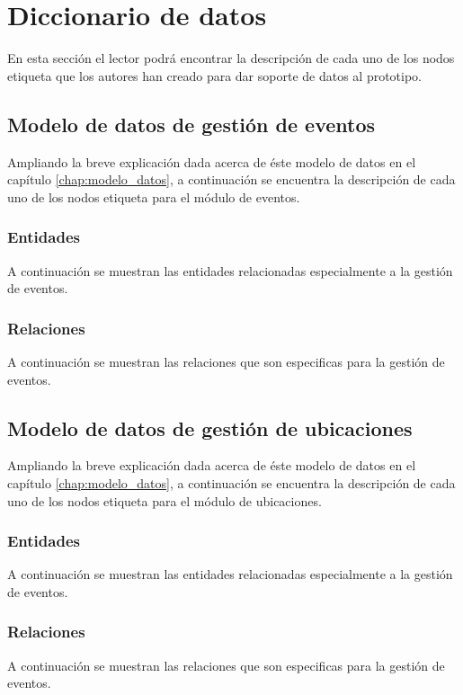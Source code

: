 \section{Diccionario de datos}
En esta sección el lector podrá encontrar la descripción de cada uno de los nodos etiqueta que los autores han creado para dar soporte de datos al prototipo.

\subsection{Modelo de datos de gestión de eventos}
Ampliando la breve explicación dada acerca de éste modelo de datos en el capítulo \ref{chap:modelo_datos}, a continuación se encuentra la descripción de cada uno de los nodos etiqueta para el módulo de eventos.

\subsubsection{Entidades}
A continuación se muestran las entidades relacionadas especialmente a la gestión de eventos.

\clearpage


\subsubsection{Relaciones}
A continuación se muestran las relaciones que son especificas para la gestión de eventos.

\clearpage


\subsection{Modelo de datos de gestión de ubicaciones}
Ampliando la breve explicación dada acerca de éste modelo de datos en el capítulo \ref{chap:modelo_datos}, a continuación se encuentra la descripción de cada uno de los nodos etiqueta para el módulo de ubicaciones.

\subsubsection{Entidades}
A continuación se muestran las entidades relacionadas especialmente a la gestión de eventos.

\clearpage


\subsubsection{Relaciones}
A continuación se muestran las relaciones que son especificas para la gestión de eventos.

